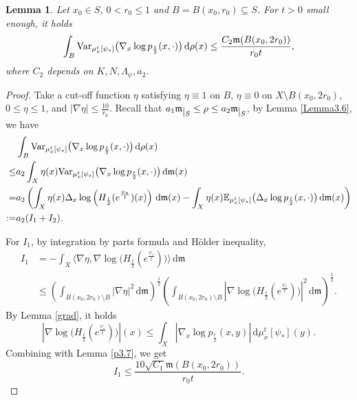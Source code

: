 \documentclass[a4paper,11pt]{article}
\numberwithin{equation}{section}
\theoremstyle{plain}
\newtheorem{lemma}[theorem]{Lemma}
\theoremstyle{definition}
\theoremstyle{remark}
\newcommand{\mm}{\mathfrak m}
\renewcommand{\d}{{\mathrm d}}
\newcommand{\restr}[1]{\lower3pt\hbox{$|_{#1}$}}
\begin{document}
	
	\begin{lemma}\label{prop3.8}
		Let $x_0\in S$, $0<r_0\leq1$ and $B=B(x_0,r_0)\subseteq S$. For $t>0$ small enough,  it holds
		\begin{equation}\label{2.24}
		 \int_B {\rm{Var}}_{ \mu_x^t[\psi_*]}\big(\nabla_x \log p_\frac{t}{2}(x,\cdot)\big) \,\d\rho(x) \leq \frac{C_2\mm(B(x_0,2r_0))}{r_0t},
		\end{equation}
		where $C_2$ depends on $K,N,\Lambda_\psi,a_2$.
		\end{lemma}
		\begin{proof}
		Take a cut-off function $\eta$ satisfying $\eta \equiv 1$ on $B$, $\eta \equiv 0$ on $X\setminus B(x_0,2r_0)$, $0 \le \eta \le 1$, and $|\nabla \eta| \leq \frac{10}{r_0}$. Recall that $a_1\mm\restr{S} \leq \rho\leq a_2\mm\restr{S}$, by Lemma \ref{Lemma3.6}, we have  
		\begin{equation}\label{J_t^cen}
			\begin{aligned}
			&\int_B {\rm{Var}}_{ \mu_x^t[\psi_*]}\big(\nabla_x \log p_\frac{t}{2}(x,\cdot)\big)  \,\d\rho(x)\\
			  \le & a_2 \int_X \eta(x) {\rm{Var}}_{ \mu_x^t[\psi_*]}\big(\nabla_x \log p_\frac{t}{2}(x,\cdot)\big)  \,\d\mm(x) \\
			 = &a_2\left(\int_X \eta(x) \Delta_x \log \left(H_\frac{t}{2}(e^\frac{\psi_*}{t})(x)\right) \,\d\mm(x)
			- \int_X \eta(x) \mathbb{E}_{\mu_x^t[\psi_*]} \big(\Delta_x \log p_{\frac{t}{2}}(x, \cdot)\big) \,\d\mm(x)\right) \\
			 := & a_2(I_1 + I_2).
		\end{aligned}
		\end{equation}
		
		For $I_1$,  by integration by parts formula and H\"older inequality, 
		\begin{equation}
			\begin{aligned}
			I_1
			&=-\int_X \langle\nabla\eta, \nabla \log \big(H_\frac{t}{2}(e^\frac{\psi_*}{t})\big)\rangle\,\d\mm\\
			&\leq\left( \int_{B(x_0,2r_0)\setminus B}|\nabla \eta|^2\,\d\mm\right)^\frac{1}{2}\left( \int_{B(x_0,2r_0)\setminus B} \left| \nabla\log \big(H_\frac{t}{2}(e^\frac{\psi_*}{t})\big)\right|^2\,\d\mm\right)^\frac{1}{2}.
			\end{aligned}
		\end{equation}
By Lemma \ref{grad}, it holds
		\begin{equation}
			\left|\nabla\log \big(H_\frac{t}{2}(e^\frac{\psi_*}{t})\big)\right|(x)\leq \int_X |\nabla_x \log p_\frac{t}{2}(x,y)| \,\d \mu_x^t[\psi_*](y).
		\end{equation}
		  Combining with Lemma \ref{p3.7}, we get
		\begin{equation}\label{3.37}
		I_1\leq \frac{10\sqrt{C_1}\mm(B(x_0,2r_0))}{r_0t}.
		\end{equation}
		\medskip
		

\end{proof}
\end{document}
